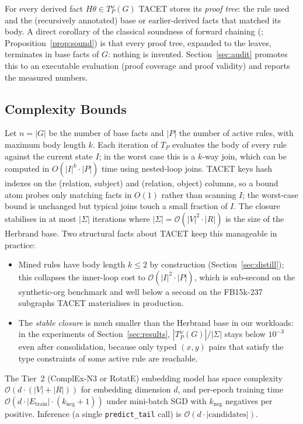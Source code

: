 \documentclass[11pt]{article}
\theoremstyle{plain}
\begin{document}
For every derived fact $H\theta \in T_P^{\omega}(G)$ TACET stores
its \emph{proof tree}: the rule used and the (recursively annotated)
base or earlier-derived facts that matched its body. A direct
corollary of the classical soundness of forward chaining
(\cite{abiteboul1995foundations}; Proposition~\ref{prop:sound}) is that
every proof tree, expanded to the leaves, terminates in base facts of
$G$: nothing is invented. Section~\ref{sec:audit} promotes this to an executable
evaluation (proof coverage and proof validity) and reports the
measured numbers.

\subsection{Complexity Bounds}
\label{sec:complexity}

Let $n = |G|$ be the number of base facts and $|P|$ the number of
active rules, with maximum body length $k$.  Each iteration of $T_P$
evaluates the body of every rule against the current state $I$;
in the worst case this is a $k$-way join, which can be computed in
$O(|I|^k \cdot |P|)$ time using nested-loop joins.  TACET keys hash
indexes on the (relation, subject) and (relation, object) columns, so a
bound atom probes only matching facts in $O(1)$ rather than scanning $I$;
the worst-case bound is unchanged but typical joins touch a small fraction
of $I$.
The closure stabilises in at most $|\Sigma|$ iterations where
$|\Sigma| = \mathcal{O}(|V|^2 \cdot |R|)$ is the size of the
Herbrand base.  Two structural facts about TACET keep this
manageable in practice:
\begin{itemize}
\item Mined rules have body length $k \le 2$ by construction
(Section~\ref{sec:distill}); this collapses the
inner-loop cost to $\mathcal{O}(|I|^2 \cdot |P|)$, which is
sub-second on the synthetic-org benchmark and well below a second
on the FB15k-237 subgraphs TACET materialises in production.
\item The \emph{stable closure} is much smaller than the Herbrand
base in our workloads: in the experiments of
Section~\ref{sec:results}, $|T_P^{\omega}(G)| / |\Sigma|$ stays
below $10^{-3}$ even after consolidation, because only typed
$(x, y)$ pairs that satisfy the type constraints of some active
rule are reachable.
\end{itemize}

The Tier~2 (ComplEx-N3 or RotatE) embedding model has space
complexity $\mathcal{O}(d \cdot (|V| + |R|))$ for embedding
dimension $d$, and per-epoch training time
$\mathcal{O}(d \cdot |E_{\text{train}}| \cdot (k_{\text{neg}} + 1))$
under mini-batch SGD with $k_{\text{neg}}$ negatives per positive.
Inference (a single \texttt{predict\_tail} call) is
$\mathcal{O}(d \cdot |\text{candidates}|)$.
\end{document}
